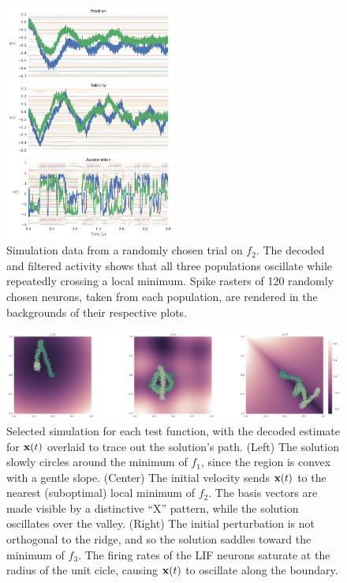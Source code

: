 \documentclass[letterpaper, 10 pt, conference]{ieeeconf}  %
\newcommand{\bolds}[1]{{\bf #1}}
\begin{document}
\begin{figure}[tb!]
  \centering
  \includegraphics[width=0.5\textwidth]{probes.png}
  \caption{Simulation data from a randomly chosen trial on $f_2$. The decoded and filtered activity shows that all three populations oscillate while repeatedly crossing a local minimum. Spike rasters of 120 randomly chosen neurons, taken from each population, are rendered in the backgrounds of their respective plots.}
\end{figure}

\begin{figure}[ht] \label{fig-paths}
  \centering
  \includegraphics[width=1.0\textwidth]{paths.png}
  \caption{Selected simulation for each test function, with the decoded estimate for $\bolds{x}(t)$ overlaid to trace out the solution's path. (Left) The solution slowly circles around the minimum of $f_1$, since the region is convex with a gentle slope. (Center) The initial velocity sends $\bolds{x}(t)$ to the nearest (suboptimal) local minimum of $f_2$. The basis vectors are made visible by a distinctive ``X'' pattern, while the solution oscillates over the valley. (Right) The initial perturbation is not orthogonal to the ridge, and so the solution saddles toward the minimum of $f_3$. The firing rates of the LIF neurons saturate at the radius of the unit cicle, causing $\bolds{x}(t)$ to oscillate along the boundary.} %
\end{figure}
\end{document}
